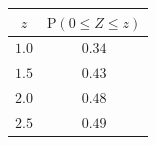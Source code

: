 {\setlength{\tabcolsep}{4pt}\renewcommand{\arraystretch}{1.3}\small%
\begin{tabular}{|c|c|}
\hline
$z$ & $\mathrm{P}(0\le Z\le z)$ \\
\hline
$1.0$ & $0.34$ \\
\hline
$1.5$ & $0.43$ \\
\hline
$2.0$ & $0.48$ \\
\hline
$2.5$ & $0.49$ \\
\hline
\end{tabular}}
